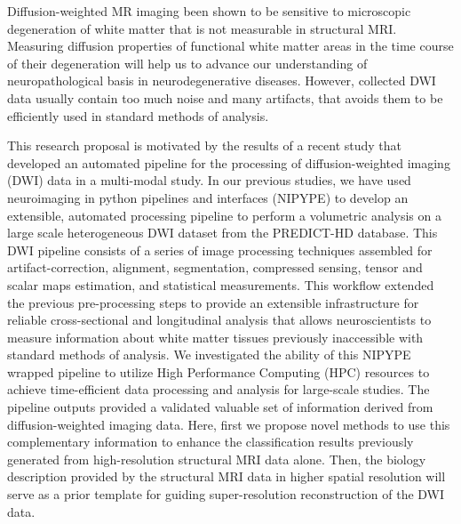 Diffusion-weighted MR imaging been shown to be sensitive to microscopic degeneration of white matter that is not measurable in structural MRI. Measuring diffusion properties of functional white matter areas in the time course of their degeneration will help us to advance our understanding of neuropathological basis in neurodegenerative diseases.
However, collected DWI data usually contain too much noise and many artifacts, that avoids them to be efficiently used in standard methods of analysis.

This research proposal is motivated by the results of a recent study that developed an automated pipeline for the processing of diffusion-weighted imaging (DWI) data in a multi-modal study.
In our previous studies, we have used neuroimaging in python pipelines and interfaces (NIPYPE) \cite{Nipype} to develop an extensible, automated processing pipeline 
to perform a volumetric analysis on a large scale heterogeneous DWI dataset from the PREDICT-HD database. This DWI pipeline consists of a series of image processing techniques assembled for artifact-correction, alignment, segmentation, compressed sensing, tensor and scalar maps estimation, and statistical measurements. This workflow extended the previous pre-processing steps \cite{Matsui2014} to provide an extensible infrastructure for reliable cross-sectional and longitudinal analysis that allows neuroscientists to measure information about white matter tissues previously inaccessible with standard methods of analysis.
We investigated the ability of this NIPYPE wrapped pipeline to utilize High Performance Computing (HPC) resources to achieve time-efficient data processing and analysis for large-scale studies. The pipeline outputs provided a validated valuable set of information derived from diffusion-weighted imaging data. Here, first we propose novel methods to use this complementary information to enhance the classification results previously generated from high-resolution structural MRI data alone. Then, the biology description provided by the structural MRI data in higher spatial resolution will serve as a prior template for guiding  super-resolution reconstruction of the DWI data.

